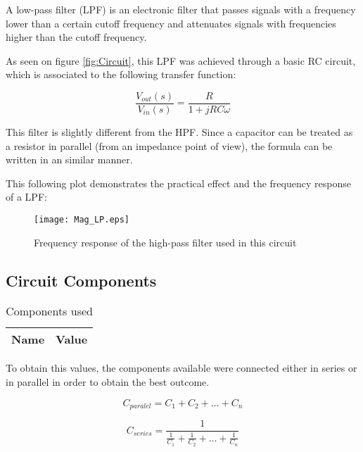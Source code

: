 A low-pass filter (LPF) is an electronic filter that passes signals with a frequency lower than a certain cutoff frequency and attenuates signals with frequencies higher than the cutoff frequency.

As seen on figure \ref{fig:Circuit}, this LPF was achieved through a basic RC circuit, which is associated to the following transfer function:

\begin{equation}
    \frac{V_{out}(s)}{V_{in}(s)} = \frac{R}{1+jRC\omega}
    \label{eq:trf_function_LPF}
\end{equation}

This filter is slightly different from the HPF. Since a capacitor can be treated as a resistor in parallel (from an impedance point of view), the formula can be written in an similar manner. 

This following plot demonstrates the practical effect and the frequency response of a LPF:

\begin{figure}[H]
    \centering
    \texttt{[image: Mag\_LP.eps]}
    \caption{Frequency response of the high-pass filter used in this circuit}
    \label{fig:freq_response_HPF}
\end{figure}

\subsection{Circuit Components}

\indent

\begin{table}[H]
  \centering
  \begin{tabular}{|l|r|}
    \hline    
    {\bf Name} & {\bf Value} \\ \hline
    
  \end{tabular}
  \caption{Components used }
  \label{tab:Components}
\end{table}

To obtain this values, the components available were connected either in series or in parallel in order to obtain the best outcome. 

\begin{equation}
    C_{paralel}= C_1+C_2+...+C_n
\end{equation}

\begin{equation}
    C_{series}= \frac{1}{\frac{1}{C_1}+\frac{1}{C_2}+...+\frac{1}{C_n}}
\end{equation}

